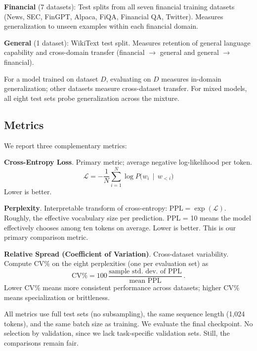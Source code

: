\textbf{Financial} (7 datasets): Test splits from all seven financial training datasets (News, SEC, FinGPT, Alpaca, FiQA, Financial QA, Twitter). Measures generalization to unseen examples within each financial domain.

\textbf{General} (1 dataset): WikiText test split. Measures retention of general language capability and cross-domain transfer (financial $\to$ general and general $\to$ financial).

For a model trained on dataset $D$, evaluating on $D$ measures in-domain generalization; other datasets measure cross-dataset transfer. For mixed models, all eight test sets probe generalization across the mixture.

\subsection{Metrics}

We report three complementary metrics:

\textbf{Cross-Entropy Loss}. Primary metric; average negative log-likelihood per token.
\begin{equation*}
    \mathcal{L} = -\frac{1}{N}\sum_{i=1}^{N} \log P\bigl(w_i \,\mid\, w_{<i}\bigr)
\end{equation*}
Lower is better.

\textbf{Perplexity}. Interpretable transform of cross-entropy: $\text{PPL} = \exp(\mathcal{L})$. Roughly, the effective vocabulary size per prediction. PPL = 10 means the model effectively chooses among ten tokens on average. Lower is better. This is our primary comparison metric.

\textbf{Relative Spread (Coefficient of Variation)}. Cross-dataset variability. Compute CV\% on the eight perplexities (one per evaluation set) as
\begin{equation*}
    \text{CV}\% = 100\,\frac{\text{sample std. dev. of PPL}}{\text{mean PPL}}\, .
\end{equation*}
Lower CV\% means more consistent performance across datasets; higher CV\% means specialization or brittleness.

All metrics use full test sets (no subsampling), the same sequence length (1,024 tokens), and the same batch size as training. We evaluate the final checkpoint. No selection by validation, since we lack task-specific validation sets. Still, the comparisons remain fair.
